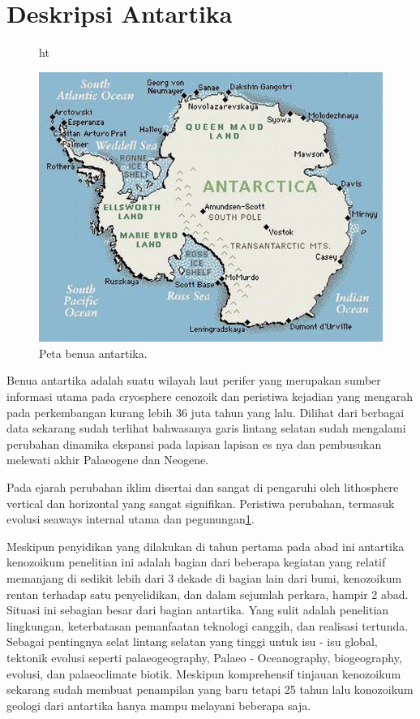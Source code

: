 





\section{Deskripsi Antartika}

\begin{figure}{ht}
\centerline{\includegraphics[width=1\textwidth]{figures/antartic.PNG}}
\caption{Peta benua antartika.}
\label{Antartika}
\end{figure}

		Benua antartika adalah suatu wilayah laut perifer yang merupakan sumber informasi utama pada cryosphere cenozoik dan peristiwa 
	kejadian yang mengarah pada perkembangan kurang lebih 36 juta tahun yang lalu. Dilihat dari berbagai data sekarang sudah terlihat bahwasanya 
	garis lintang selatan sudah mengalami perubahan dinamika ekspansi pada lapisan lapisan es nya dan pembusukan melewati akhir Palaeogene dan Neogene. 

	Pada ejarah perubahan iklim disertai dan sangat di pengaruhi oleh lithosphere vertical dan horizontal yang sangat signifikan. Peristiwa perubahan, 
	termasuk evolusi seaways internal utama dan pegunungan\ref{Antartika}. 

		
		Meskipun penyidikan yang dilakukan di tahun pertama pada abad ini antartika kenozoikum penelitian ini adalah bagian dari beberapa kegiatan yang 
	relatif memanjang di sedikit lebih dari 3 dekade di bagian lain dari bumi, kenozoikum rentan terhadap satu penyelidikan, dan dalam sejumlah perkara, 
	hampir 2 abad. Situasi ini sebagian besar dari bagian antartika. Yang sulit adalah penelitian lingkungan, keterbatasan pemanfaatan teknologi canggih, 
	dan realisasi tertunda. Sebagai pentingnya selat lintang selatan yang tinggi untuk isu - isu global, tektonik evolusi seperti  palaeogeography, 
	Palaeo - Oceanography, biogeography, evolusi, dan palaeoclimate biotik. Meskipun komprehensif tinjauan kenozoikum sekarang sudah membuat penampilan yang baru 
	tetapi 25 tahun lalu konozoikum geologi dari antartika hanya mampu melayani beberapa saja.
	
